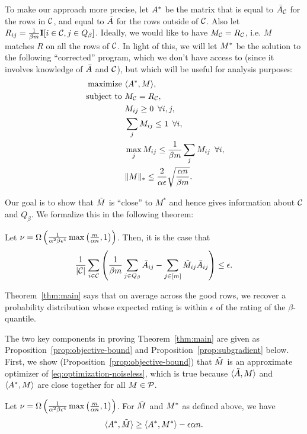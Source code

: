 To make our approach more precise, let $A^*$ be the matrix that is equal to 
$\bar{A}_{\mathcal{C}}$ for the rows in $\mathcal{C}$, 
and equal to $\tilde{A}$ for the rows outside of $\mathcal{C}$. Also let 
$R_{ij} = \frac{1}{\beta m}\mathbf{I}[i \in \mathcal{C}, j \in Q_{\beta}]$. 
Ideally, we would like to have $M_{\mathcal{C}} = R_{\mathcal{C}}$, i.e. $M$ matches $R$ on 
all the rows of $\mathcal{C}$. In light of this, 
we will let $M^*$ be the solution to the following ``corrected'' program, which 
we don't have access to (since it involves knowledge of $\bar{A}$ and $\mathcal{C}$), 
but which will be useful for analysis purposes:
\begin{align}
\label{eq:optimization-noiseless}
\text{maximize } &\langle A^*, M \rangle, \\
\notag \text{ subject to } &M_{\mathcal{C}} = R_{\mathcal{C}}, \\
\notag  &M_{ij} \geq 0 \,\,\, \forall i,j, \\
\notag  &\sum_j M_{ij} \leq 1 \,\,\, \forall i, \\
\notag  &\max_j M_{ij} \leq \frac{1}{\beta m}\sum_j M_{ij} \,\,\, \forall i, \\
\notag  &\|M\|_* \leq \frac{2}{\alpha\epsilon}\sqrt{\frac{\alpha n}{\beta m}}.
\end{align}

Our goal is to show that $\tilde{M}$ is ``close'' to $M^*$ and hence gives information 
about $\mathcal{C}$ and $Q_{\beta}$. 
We formalize this in the following theorem:
\begin{theorem}
\label{thm:main}
Let $\nu = \Omega\left( \frac{1}{\alpha^2\beta\epsilon^4}\max\left( \frac{m}{\alpha n},1 \right) \right)$. Then, it is the case that 
\[ \frac{1}{|\mathcal{C}|} \sum_{i \in \mathcal{C}} \left( \frac{1}{\beta m} \sum_{j \in Q_{\beta}} \bar{A}_{ij} - \sum_{j \in [m]} \tilde{M}_{ij} \bar{A}_{ij} \right) \leq \epsilon. \]
\end{theorem}
Theorem~\ref{thm:main} says that on average across the good rows, we recover 
a probability distribution whose expected rating is within $\epsilon$ of 
the rating of the $\beta$-quantile. 

The two key components in proving Theorem~\ref{thm:main} are 
given as Proposition~\ref{prop:objective-bound} and 
Proposition~\ref{prop:subgradient} below. First, we show 
(Proposition~\ref{prop:objective-bound}) that $\tilde{M}$ is an approximate optimizer 
of \ref{eq:optimization-noiseless}, which is true because 
$\langle \tilde{A}, M \rangle$ and $\langle A^*, M \rangle$ are close together for 
all $M \in \mathcal{P}$.
\begin{proposition}
\label{prop:objective-bound}
Let $\nu = \Omega\left( \frac{1}{\alpha^2\beta\epsilon^4}\max\left( \frac{m}{\alpha n},1 \right) \right)$. For $\tilde{M}$ and $M^*$ as defined above, we have
\begin{equation}
\label{eq:objective-bound}
\langle A^*, \tilde{M} \rangle \geq \langle A^*, M^* \rangle - \epsilon \alpha n.
\end{equation}
\end{proposition}

